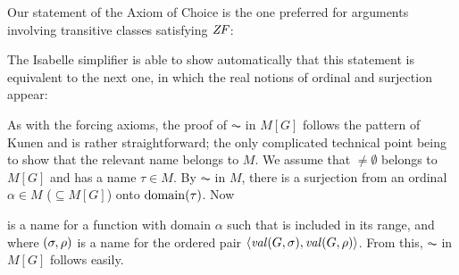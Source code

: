 Our statement of the Axiom of Choice is the one preferred for
arguments involving transitive classes satisfying $\mathit{ZF}$:
%
\begin{center}
\end{center}
%
The Isabelle simplifier is able to show automatically that this
statement is equivalent to the next one, in which the real notions of
ordinal and surjection appear:
%
\begin{center}
\end{center}

As with the forcing axioms, the proof of $\AC$ in $M[G]$ follows the pattern of Kunen
\cite[IV.2.27]{kunen2011set} and is rather
straightforward; the only complicated technical point being to show
that the relevant name belongs to $M$. We assume that ${}\neq\emptyset$
belongs to $M[G]$ and has a name $\tau\in M$. By $\AC$ in $M$, there
is a surjection  from an ordinal $\alpha\in M$ ($\subseteq M[G]$) onto
$\operatorname{domain}(\tau)$. Now
%
\begin{center}
\end{center}
%
is a name for a function  with domain $\alpha$ such that 
is included in its range, and where
$(\sigma,\rho)$ is a name for the
ordered pair $\langle\operatorname{\mathit{val}}(G,\sigma),\operatorname{\mathit{val}}(G,\rho)\rangle$. From this, $\AC$ in
$M[G]$ follows easily.

